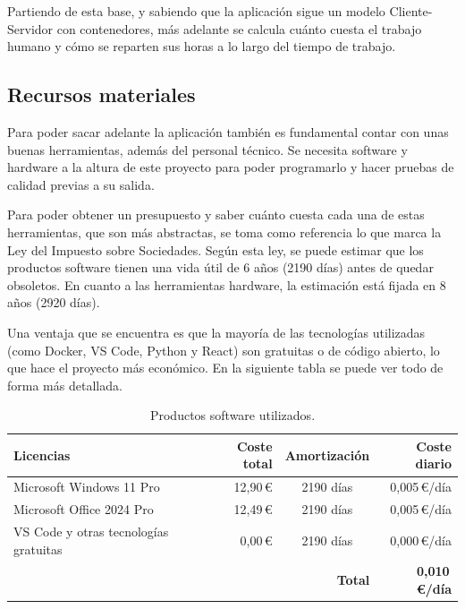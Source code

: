 Partiendo de esta base, y sabiendo que la aplicación sigue un modelo Cliente-Servidor con
contenedores, más adelante se calcula cuánto cuesta el trabajo humano y cómo se reparten
sus horas a lo largo del tiempo de trabajo.

\subsection{Recursos materiales}

Para poder sacar adelante la aplicación también es fundamental contar con unas buenas
herramientas, además del personal técnico. Se necesita software y hardware a la altura de
este proyecto para poder programarlo y hacer pruebas de calidad previas a su salida.

Para poder obtener un presupuesto y saber cuánto cuesta cada una de estas herramientas,
que son más abstractas, se toma como referencia lo que marca la Ley del Impuesto sobre
Sociedades. Según esta ley, se puede estimar que los productos software tienen una vida
útil de 6 años (2190 días) antes de quedar obsoletos. En cuanto a las herramientas hardware,
la estimación está fijada en 8 años (2920 días).

Una ventaja que se encuentra es que la mayoría de las tecnologías utilizadas (como Docker,
VS Code, Python y React) son gratuitas o de código abierto, lo que hace el proyecto más
económico. En la siguiente tabla se puede ver todo de forma más detallada.

\begin{table}[H]
	\centering
	\caption{Productos software utilizados.}
	\begin{tabularx}{\textwidth}{X r c r}
		\toprule
		\textbf{Licencias} & \textbf{Coste total} & \textbf{Amortización} & \textbf{Coste diario} \\
		\midrule
		Microsoft Windows 11 Pro               & 12,90\,\euro{} & 2190 días & 0,005\,\euro{}/día \\
		Microsoft Office 2024 Pro              & 12,49\,\euro{} & 2190 días & 0,005\,\euro{}/día \\
		VS Code y otras tecnologías gratuitas  & 0,00\,\euro{}  & 2190 días & 0,000\,\euro{}/día \\
		\midrule
		\multicolumn{3}{r}{\textbf{Total}} & \textbf{0,010\,\euro{}/día} \\
		\bottomrule
	\end{tabularx}
\end{table}

